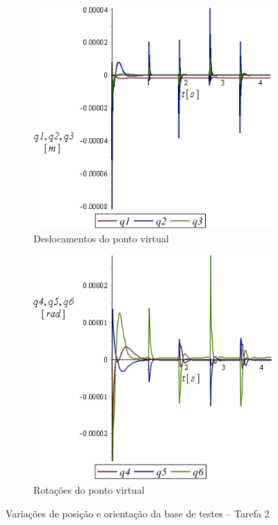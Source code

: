 \begin{figure}[h]
    \centering
    \begin{subfigure}[b]{0.48\textwidth}
        \includegraphics[width=\textwidth]{figs/t2_q123_base_testes}
        \caption{Deslocamentos do ponto virtual}
        \label{fig::t2_q123_base_testes}
    \end{subfigure}
    \quad %
    \begin{subfigure}[b]{0.48\textwidth}
        \includegraphics[width=\textwidth]{figs/t2_q456_base_testes}
        \caption{Rotações do ponto virtual}
        \label{fig::t2_q456_base_testes}
    \end{subfigure}
    \caption{Variações de posição e orientação da base de testes -- Tarefa 2}
    \label{fig::t2_q123456_base_testes}
\end{figure}

